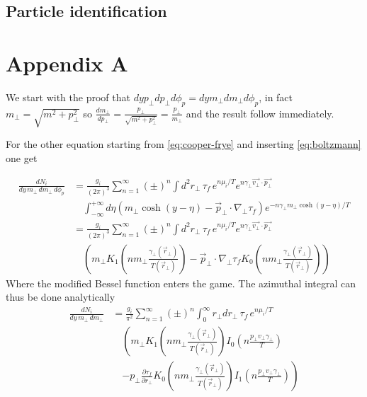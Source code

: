 \documentclass[12pt,a4paper]{book}
\begin{document}
    \subsection{Particle identification}
	

	\appendix
	\renewcommand{\thesection}{\Alph{section}}
	\section{Appendix A} \label{app:A}
	We start with the proof that $dy p_\perp dp_\perp d\phi_p = dy m_\perp dm_\perp d\phi_p$, in fact $m_\perp=\sqrt{m^2 + p_\perp^2}$ so $\frac{dm_\perp}{dp_\perp}= \frac{p_\perp}{\sqrt{m^2 + p_\perp^2}} = \frac{p_\perp}{m_\perp}$ and the result follow immediately.
	
	For the other equation starting from \ref{eq:cooper-frye} and inserting \ref{eq:boltzmann} one get
	
	\begin{equation}
		\begin{aligned}
			\frac{d N_i}{dy\, m_\perp\, dm_\perp\, d\phi_p} &= \frac{g_i}{(2\pi)^3} \sum_{n=1}^{\infty} (\pm)^n \int d^2 r_\perp \, \tau_f \, e^{n\mu_i/T} e^{n\gamma_\perp \vec{v_\perp} \cdot \vec{p_\perp}} \\
			& \quad \int_{-\infty}^{+\infty} d\eta \left(m_\perp \cosh(y-\eta) - \vec{p}_\perp \cdot \nabla_\perp \tau_f \right) e^{-n \gamma_\perp m_\perp \cosh(y-\eta)/T} \\
			&= \frac{g_i}{(2\pi)^3} \sum_{n=1}^{\infty} (\pm)^n \int d^2 r_\perp \, \tau_f \, e^{n\mu_i/T} e^{n\gamma_\perp \vec{v_\perp} \cdot \vec{p_\perp}} \\
			& \quad \left( m_\perp K_1\left(n m_\perp \frac{\gamma_\perp(\vec{r}_\perp)}{T(\vec{r}_\perp)}\right) - \vec{p}_\perp \cdot \nabla_\perp \tau_f K_0\left(n m_\perp \frac{\gamma_\perp(\vec{r}_\perp)}{T(\vec{r}_\perp)}\right) \right)
		\end{aligned}
	\end{equation}
	Where the modified Bessel function enters the game. The azimuthal integral can thus be done analytically
	\begin{equation}
		\begin{aligned}
			\frac{d N_i}{dy\, m_\perp\, dm_\perp} &= \frac{g_i}{\pi^2} \sum_{n=1}^{\infty} (\pm)^n \int_{0}^{\infty} r_\perp dr_\perp \, \tau_f \, e^{n\mu_i/T} \\
			& \quad \left( m_\perp K_1\left(n m_\perp \frac{\gamma_\perp(\vec{r}_\perp)}{T(\vec{r}_\perp)}\right) I_0\left(n \frac{p_\perp v_\perp \gamma_\perp}{T}\right) \right. \\
			& \quad \left. - p_\perp \frac{\partial \tau_f}{\partial r_\perp} K_0\left(n m_\perp \frac{\gamma_\perp(\vec{r}_\perp)}{T(\vec{r}_\perp)}\right) I_1\left(n \frac{p_\perp v_\perp \gamma_\perp}{T}\right) \right)
		\end{aligned}
	\end{equation}
	
\end{document}
